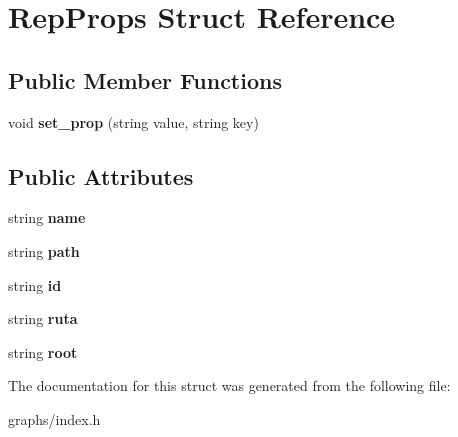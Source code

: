 \hypertarget{structRepProps}{}\section{Rep\+Props Struct Reference}
\label{structRepProps}
\subsection*{Public Member Functions}
\begin{DoxyCompactItemize}
\item 
\mbox{\label{structRepProps_af36709a0332ccf0ea23cd82487fc6c62}} 
void {\bfseries set\+\_\+prop} (string value, string key)
\end{DoxyCompactItemize}
\subsection*{Public Attributes}
\begin{DoxyCompactItemize}
\item 
\mbox{\label{structRepProps_ad9489156040788a320b8162f047392b1}} 
string {\bfseries name}
\item 
\mbox{\label{structRepProps_afb95ee912cbb7f5000fcc30f234f4d4e}} 
string {\bfseries path}
\item 
\mbox{\label{structRepProps_a38312b3f7d6e91f3cfa37bfb79b5c34b}} 
string {\bfseries id}
\item 
\mbox{\label{structRepProps_a621a094b84ba0f9f9d6ad1d29b227634}} 
string {\bfseries ruta}
\item 
\mbox{\label{structRepProps_ab71a42b000afb27075489654cdd03684}} 
string {\bfseries root}
\end{DoxyCompactItemize}


The documentation for this struct was generated from the following file\+:\begin{DoxyCompactItemize}
\item 
graphs/index.\+h\end{DoxyCompactItemize}
